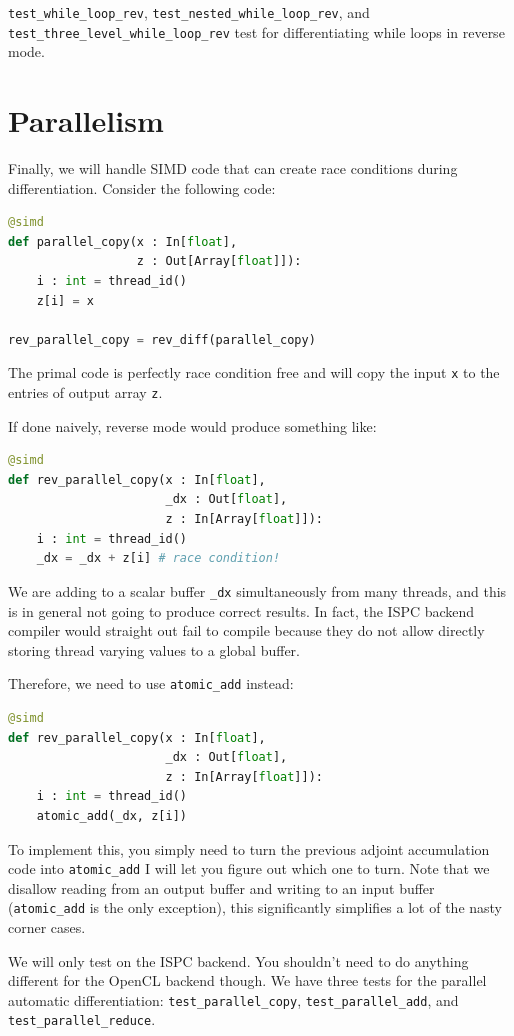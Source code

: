 \lstinline{test_while_loop_rev}, \lstinline{test_nested_while_loop_rev}, and \lstinline{test_three_level_while_loop_rev} test for differentiating while loops in reverse mode.

\section{Parallelism}
Finally, we will handle SIMD code that can create race conditions during differentiation. Consider the following code:
\begin{lstlisting}[language=python]
@simd
def parallel_copy(x : In[float],
                  z : Out[Array[float]]):
    i : int = thread_id()
    z[i] = x

rev_parallel_copy = rev_diff(parallel_copy)
\end{lstlisting}
The primal code is perfectly race condition free and will copy the input \lstinline{x} to the entries of output array \lstinline{z}.

If done naively, reverse mode would produce something like:
\begin{lstlisting}[language=python]
@simd
def rev_parallel_copy(x : In[float],
                      _dx : Out[float],
                      z : In[Array[float]]):
    i : int = thread_id()
    _dx = _dx + z[i] # race condition!
\end{lstlisting}
We are adding to a scalar buffer \lstinline{_dx} simultaneously from many threads, and this is in general not going to produce correct results. In fact, the ISPC backend compiler would straight out fail to compile because they do not allow directly storing thread varying values to a global buffer.

Therefore, we need to use \lstinline{atomic_add} instead:
\begin{lstlisting}[language=python]
@simd
def rev_parallel_copy(x : In[float],
                      _dx : Out[float],
                      z : In[Array[float]]):
    i : int = thread_id()
    atomic_add(_dx, z[i])
\end{lstlisting}

To implement this, you simply need to turn the previous adjoint accumulation code into \lstinline{atomic_add} I will let you figure out which one to turn. Note that we disallow reading from an output buffer and writing to an input buffer (\lstinline{atomic_add} is the only exception), this significantly simplifies a lot of the nasty corner cases.

We will only test on the ISPC backend. You shouldn't need to do anything different for the OpenCL backend though. We have three tests for the parallel automatic differentiation: \lstinline{test_parallel_copy}, \lstinline{test_parallel_add}, and \lstinline{test_parallel_reduce}.


